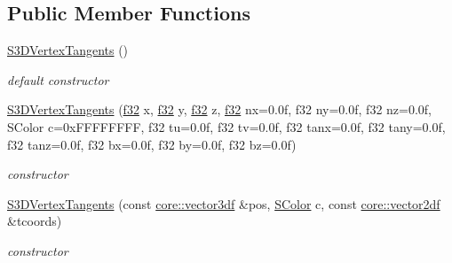\subsection*{Public Member Functions}
\begin{DoxyCompactItemize}
\item 
\mbox{\label{structirr_1_1video_1_1S3DVertexTangents_a73c272df89a8d4d3cb5c94363a4b85d1}} 
\hyperlink{structirr_1_1video_1_1S3DVertexTangents_a73c272df89a8d4d3cb5c94363a4b85d1}{S3\+D\+Vertex\+Tangents} ()
\begin{DoxyCompactList}\small\item\em default constructor \end{DoxyCompactList}\item 
\mbox{\label{structirr_1_1video_1_1S3DVertexTangents_a9e0e424a375e5b090ba5c237a87feff2}} 
\hyperlink{structirr_1_1video_1_1S3DVertexTangents_a9e0e424a375e5b090ba5c237a87feff2}{S3\+D\+Vertex\+Tangents} (\hyperlink{namespaceirr_a0277be98d67dc26ff93b1a6a1d086b07}{f32} x, \hyperlink{namespaceirr_a0277be98d67dc26ff93b1a6a1d086b07}{f32} y, \hyperlink{namespaceirr_a0277be98d67dc26ff93b1a6a1d086b07}{f32} z, \hyperlink{namespaceirr_a0277be98d67dc26ff93b1a6a1d086b07}{f32} nx=0.\+0f, f32 ny=0.\+0f, f32 nz=0.\+0f, S\+Color c=0x\+F\+F\+F\+F\+F\+F\+F\+F, f32 tu=0.\+0f, f32 tv=0.\+0f, f32 tanx=0.\+0f, f32 tany=0.\+0f, f32 tanz=0.\+0f, f32 bx=0.\+0f, f32 by=0.\+0f, f32 bz=0.\+0f)
\begin{DoxyCompactList}\small\item\em constructor \end{DoxyCompactList}\item 
\mbox{\label{structirr_1_1video_1_1S3DVertexTangents_a55532d7609227010fd31b3b9fbb4c03a}} 
\hyperlink{structirr_1_1video_1_1S3DVertexTangents_a55532d7609227010fd31b3b9fbb4c03a}{S3\+D\+Vertex\+Tangents} (const \hyperlink{namespaceirr_1_1core_ae6e2b2a6c552833ebbd5b7463d03586b}{core\+::vector3df} \&pos, \hyperlink{classirr_1_1video_1_1SColor}{S\+Color} c, const \hyperlink{namespaceirr_1_1core_a116f90bd31515724b6235014ee2b74d5}{core\+::vector2df} \&tcoords)
\begin{DoxyCompactList}\small\item\em constructor \end{DoxyCompactList}\item 

\end{DoxyCompactItemize}
